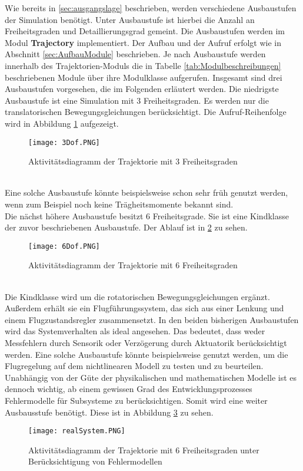 Wie bereits in \ref{sec:ausgangslage} beschrieben, werden verschiedene Ausbaustufen der Simulation benötigt. Unter Ausbaustufe ist hierbei die Anzahl an Freiheitsgraden und Detaillierungsgrad gemeint. Die Ausbaustufen werden im Modul \textbf{Trajectory} implementiert. Der Aufbau und der Aufruf erfolgt wie in Abschnitt \ref{sec:AufbauModule} beschrieben. Je nach Ausbaustufe werden innerhalb des Trajektorien-Moduls die in Tabelle \ref{tab:Modulbeschreibungen}  beschriebenen Module über ihre Modulklasse aufgerufen.
Insgesamt sind drei Ausbaustufen vorgesehen, die im Folgenden erläutert werden.\newpage
Die niedrigste Ausbaustufe ist eine Simulation mit 3 Freiheitsgraden. Es werden nur die translatorischen Bewegungsgleichungen berücksichtigt. Die Aufruf-Reihenfolge wird in Abbildung \ref{fig:3Dof} aufgezeigt.
\begin{figure}[h]
	\centering\texttt{[image: 3Dof.PNG]}
	\label{fig:3Dof}
	\caption{Aktivitätsdiagramm der Trajektorie mit 3 Freiheitsgraden}
\end{figure}\\
Eine solche Ausbaustufe könnte beispielsweise schon sehr früh genutzt werden, wenn zum Beispiel noch keine Trägheitsmomente bekannt sind. \\
Die nächst höhere Ausbaustufe besitzt 6 Freiheitsgrade. Sie ist eine Kindklasse der zuvor beschriebenen Ausbaustufe. Der Ablauf ist in \ref{fig:6Dof} zu sehen. 
\begin{figure}[h]
	\texttt{[image: 6Dof.PNG]}
	\label{fig:6Dof}
	\caption{Aktivitätsdiagramm der Trajektorie mit 6 Freiheitsgraden}
\end{figure}\\
Die Kindklasse wird um die rotatorischen Bewegungsgleichungen ergänzt. Außerdem erhält sie ein Flugführungssystem, das sich aus einer Lenkung und einem Flugzustandsregler zusammensetzt. In den beiden bisherigen Ausbaustufen wird das Systemverhalten als ideal angesehen. Das bedeutet, dass weder Messfehlern durch Sensorik oder Verzögerung durch Aktuatorik berücksichtigt werden. Eine solche Ausbaustufe könnte beispielsweise genutzt werden, um die Flugregelung auf dem nichtlinearen Modell zu testen und zu beurteilen. \\
Unabhängig von der Güte der physikalischen und mathematischen Modelle ist es dennoch wichtig, ab einem gewissen Grad des Entwicklungsprozesses Fehlermodelle für Subsysteme zu berücksichtigen. Somit wird eine weiter Ausbausstufe benötigt. Diese ist in Abbildung \ref{fig:realSys} zu sehen.
\begin{figure}[h]
	\texttt{[image: realSystem.PNG]}
	\label{fig:realSys}
	\caption{Aktivitätsdiagramm der Trajektorie mit 6 Freiheitsgraden unter Berücksichtigung von Fehlermodellen}
\end{figure}\\
